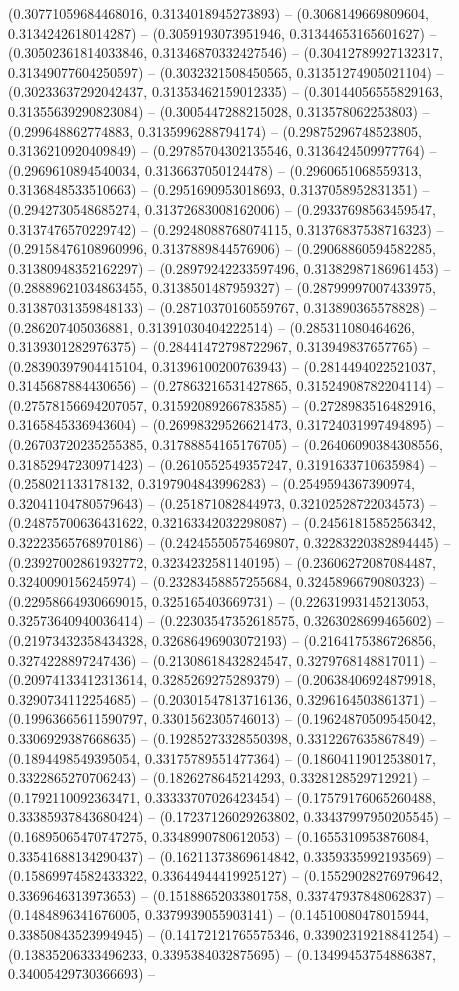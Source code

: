 (0.30771059684468016, 0.3134018945273893) -- (0.3068149669809604, 0.3134242618014287) -- (0.3059193073951946, 0.31344653165601627) -- (0.30502361814033846, 0.31346870332427546) -- (0.30412789927132317, 0.31349077604250597) -- (0.3032321508450565, 0.31351274905021104) -- (0.30233637292042437, 0.31353462159012335) -- (0.30144056555829163, 0.31355639290823084) -- (0.3005447288215028, 0.313578062253803) -- (0.299648862774883, 0.3135996288794174) -- (0.29875296748523805, 0.3136210920409849) -- (0.29785704302135546, 0.3136424509977764) -- (0.2969610894540034, 0.3136637050124478) -- (0.2960651068559313, 0.3136848533510663) -- (0.2951690953018693, 0.3137058952831351) -- (0.2942730548685274, 0.31372683008162006) -- (0.29337698563459547, 0.3137476570229742) -- (0.29248088768074115, 0.31376837538716323) -- (0.29158476108960996, 0.3137889844576906) -- (0.29068860594582285, 0.31380948352162297) -- (0.28979242233597496, 0.31382987186961453) -- (0.28889621034863455, 0.3138501487959327) -- (0.28799997007433975, 0.31387031359848133) -- (0.28710370160559767, 0.313890365578828) -- (0.286207405036881, 0.31391030404222514) -- (0.285311080464626, 0.3139301282976375) -- (0.28441472798722967, 0.313949837657765) -- (0.28390397904415104, 0.31396100200763943) -- (0.2814494022521037, 0.3145687884430656) -- (0.27863216531427865, 0.31524908782204114) -- (0.27578156694207057, 0.31592089266783585) -- (0.2728983516482916, 0.3165845336943604) -- (0.26998329526621473, 0.31724031997494895) -- (0.26703720235255385, 0.31788854165176705) -- (0.26406090384308556, 0.31852947230971423) -- (0.2610552549357247, 0.3191633710635984) -- (0.258021133178132, 0.3197904843996283) -- (0.2549594367390974, 0.32041104780579643) -- (0.251871082844973, 0.32102528722034573) -- (0.24875700636431622, 0.32163342032298087) -- (0.2456181585256342, 0.32223565768970186) -- (0.24245550575469807, 0.32283220382894445) -- (0.23927002861932772, 0.3234232581140195) -- (0.23606272087084487, 0.3240090156245974) -- (0.23283458857255684, 0.3245896679080323) -- (0.22958664930669015, 0.325165403669731) -- (0.22631993145213053, 0.32573640940036414) -- (0.22303547352618575, 0.3263028699465602) -- (0.21973432358434328, 0.32686496903072193) -- (0.2164175386726856, 0.3274228897247436) -- (0.21308618432824547, 0.3279768148817011) -- (0.20974133412313614, 0.3285269275289379) -- (0.20638406924879918, 0.3290734112254685) -- (0.20301547813716136, 0.3296164503861371) -- (0.19963665611590797, 0.3301562305746013) -- (0.19624870509545042, 0.3306929387668635) -- (0.19285273328550398, 0.3312267635867849) -- (0.1894498549395054, 0.33175789551477364) -- (0.18604119012538017, 0.3322865270706243) -- (0.1826278645214293, 0.3328128529712921) -- (0.1792110092363471, 0.33333707026423454) -- (0.17579176065260488, 0.33385937843680424) -- (0.17237126029263802, 0.33437997950205545) -- (0.16895065470747275, 0.3348990780612053) -- (0.1655310953876084, 0.33541688134290437) -- (0.16211373869614842, 0.3359335992193569) -- (0.15869974582433322, 0.33644944419925127) -- (0.15529028276979642, 0.3369646313973653) -- (0.15188652033801758, 0.33747937848062837) -- (0.1484896341676005, 0.3379939055903141) -- (0.14510080478015944, 0.33850843523994945) -- (0.14172121765575346, 0.33902319218841254) -- (0.13835206333496233, 0.3395384032875695) -- (0.13499453754886387, 0.34005429730366693) -- 
